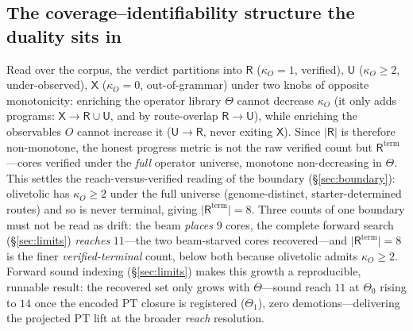 \subsection{The coverage--identifiability structure the duality sits in}\label{sec:coverage-structure}
Read over the corpus, the verdict partitions into $\mathsf{R}$ ($\kappa_O{=}1$, verified), $\mathsf{U}$
($\kappa_O{\ge}2$, under-observed), $\mathsf{X}$ ($\kappa_O{=}0$, out-of-grammar) under two knobs of opposite
monotonicity: enriching the operator library $\Theta$ cannot decrease $\kappa_O$ (it only adds programs:
$\mathsf{X}\to\mathsf{R}\cup\mathsf{U}$, and by route-overlap $\mathsf{R}\to\mathsf{U}$), while enriching the
observables $O$ cannot increase it ($\mathsf{U}\to\mathsf{R}$, never exiting $\mathsf{X}$). Since
$\lvert\mathsf{R}\rvert$ is therefore non-monotone, the honest progress metric is not the raw verified count
but $\mathsf{R}^{\mathrm{term}}$---cores verified under the \emph{full} operator universe, monotone
non-decreasing in $\Theta$. This settles the reach-versus-verified reading of the boundary
(\S\ref{sec:boundary}): olivetolic has $\kappa_O{\ge}2$ under the full universe (genome-distinct,
starter-determined routes) and so is never terminal, giving $\lvert\mathsf{R}^{\mathrm{term}}\rvert{=}8$.
Three counts of one boundary must not be read as drift: the beam \emph{places} $9$ cores, the complete
forward search (\S\ref{sec:limits}) \emph{reaches} $11$---the two beam-starved cores recovered---and
$\lvert\mathsf{R}^{\mathrm{term}}\rvert{=}8$ is the finer \emph{verified-terminal} count, below both because
olivetolic admits $\kappa_O{\ge}2$.
Forward sound indexing (\S\ref{sec:limits}) makes this growth a reproducible, runnable result: the recovered
set only grows with $\Theta$---sound reach $11$ at $\Theta_0$ rising to $14$ once the encoded PT closure is
registered ($\Theta_1$), zero demotions---delivering the projected PT lift at the broader \emph{reach} resolution.

